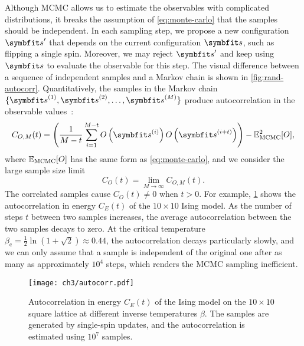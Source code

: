 Although MCMC allows us to estimate the observables with complicated distributions, it breaks the assumption of \cref{eq:monte-carlo} that the samples should be independent. In each sampling step, we propose a new configuration $\vs'$ that depends on the current configuration $\vs$, such as flipping a single spin. Moreover, we may reject $\vs'$ and keep using $\vs$ to evaluate the observable for this step. The visual difference between a sequence of independent samples and a Markov chain is shown in \cref{fig:rand-autocorr}. Quantitatively, the samples in the Markov chain $\{\vs^{(1)}, \vs^{(2)}, \ldots, \vs^{(M)}\}$ produce autocorrelation in the observable values~\cite{muller1973dynamic}:
\begin{equation}
C_{O, M}(t) = \left( \frac{1}{M - t} \sum_{i = 1}^{M - t} O\left( \vs^{(i)} \right) O\left( \vs^{(i + t)} \right) \right) - \bbE_\text{MCMC}^2[O],
\end{equation}
where $\mathbb{E}_\text{MCMC}[O]$ has the same form as \cref{eq:monte-carlo}, and we consider the large sample size limit
\begin{equation}
C_O(t) = \lim_{M \to \infty} C_{O, M}(t).
\end{equation}
The correlated samples cause $C_O(t) \neq 0$ when $t > 0$. For example, \cref{fig:autocorr} shows the autocorrelation in energy $C_E(t)$ of the $10 \times 10$ Ising model. As the number of steps $t$ between two samples increases, the average autocorrelation between the two samples decays to zero. At the critical temperature $\beta_\text{c} = \frac{1}{2} \ln(1 + \sqrt{2}) \approx 0.44$, the autocorrelation decays particularly slowly, and we can only assume that a sample is independent of the original one after as many as approximately $10^4$ steps, which renders the MCMC sampling inefficient.

\begin{figure}[htb]
\centering
\texttt{[image: ch3/autocorr.pdf]}
\caption[Autocorrelation in energy of Ising model at different temperatures]{
Autocorrelation in energy $C_E(t)$ of the Ising model on the $10 \times 10$ square lattice at different inverse temperatures $\beta$. The samples are generated by single-spin updates, and the autocorrelation is estimated using $10^7$ samples.
}
\label{fig:autocorr}
\end{figure}

